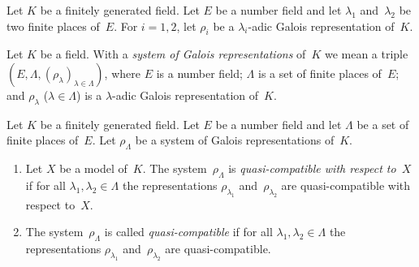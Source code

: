 \documentclass[10pt,twoside,leqno]{article}
\numberwithin{equation}{subsection}
\newcommand{\cl}{\textnormal{cl}}
\begin{document}
\begin{definition} %
 \label{quasi-compatible-representations}
	Let $K$ be a finitely generated field.
 Let $E$ be a number field and
 let $\lambda_{1}$ and~$\lambda_{2}$ be two finite places of~$E$.
 For $i = 1,2$, let $\rho_{i}$ be
 a $\lambda_{i}$-adic Galois representation of~$K$.
\end{definition}

\begin{definition} %
 \label{system-galois-representations}
 Let $K$ be a field.
 With a \emph{system of Galois representations} of~$K$ we mean a triple
 $(E, \Lambda, (\rho_{\lambda})_{\lambda \in \Lambda})$,
 where
 $E$ is a number field;
 $\Lambda$ is a set of finite places of~$E$; and
 $\rho_{\lambda}$ ($\lambda \in \Lambda$)
 is a $\lambda$-adic Galois representation of~$K$.
\end{definition}

\begin{definition} %
 \label{quasi-compatible-system}
 Let $K$ be a finitely generated field.
 Let $E$ be a number field
 and let $\Lambda$ be a set of finite places of~$E$.
 Let $\rho_{\Lambda}$ be a system of Galois representations of~$K$.
 \begin{enumerate}
  \item Let $X$ be a model of~$K$.
   The system~$\rho_{\Lambda}$ is
   \emph{quasi-compatible with respect to~$X$}
   if for all $\lambda_{1}, \lambda_{2} \in \Lambda$
   the representations $\rho_{\lambda_{1}}$ and~$\rho_{\lambda_{2}}$
   are quasi-compatible with respect to~$X$.
  \item The system~$\rho_{\Lambda}$ is called
   \emph{quasi-compatible}
   if for all $\lambda_{1}, \lambda_{2} \in \Lambda$
   the representations $\rho_{\lambda_{1}}$ and~$\rho_{\lambda_{2}}$
   are quasi-compatible.
 \end{enumerate}
\end{definition}
\end{document}
